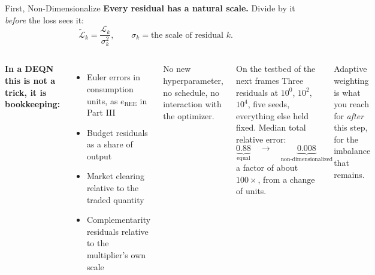 \documentclass[aspectratio=169,11pt]{beamer}
\newcommand{\emphc}[1]{\textcolor{harvardcrimson}{#1}}
\begin{document}
\begin{frame}{First, Non-Dimensionalize}
\textbf{Every residual has a natural scale.} Divide by it \emph{before} the loss sees it:
\[
  \tilde{\mathcal{L}}_k = \frac{\mathcal{L}_k}{\sigma_k^2},
  \qquad
  \sigma_k = \text{the scale of residual } k .
\]

\vspace{0.15cm}
\begin{columns}[T]
\textbf{In a DEQN this is not a trick, it is bookkeeping:}
\begin{itemize}\itemsep1pt\footnotesize
    \item Euler errors in \emphc{consumption units}, as $e_{\mathrm{REE}}$ in Part III
    \item Budget residuals as a \emphc{share of output}
    \item Market clearing relative to the \emphc{traded quantity}
    \item Complementarity residuals relative to the \emphc{multiplier's own scale}
\end{itemize}

\vspace{0.2cm}
{\footnotesize No new hyperparameter, no schedule, no interaction with the optimizer.}

\begin{exampleblock}{On the testbed of the next frames}
\footnotesize
Three residuals at $10^0$, $10^2$, $10^4$, five seeds, everything else held fixed. Median total relative error:
\[
  \underbrace{0.88}_{\text{equal}}
  \quad\longrightarrow\quad
  \underbrace{0.008}_{\text{non-dimensionalized}}
\]
a factor of about \emphc{$100\times$}, from a change of units.
\end{exampleblock}

\vspace{0.15cm}
{\footnotesize Adaptive weighting is what you reach for \emph{after} this step, for the imbalance that remains.}
\end{columns}
\end{frame}
\end{document}
